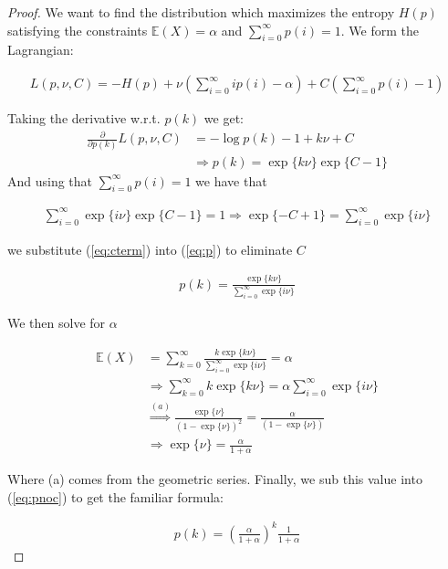 \documentclass[]{article}
\theoremstyle{mattstyle}
\theoremstyle{definition}
\begin{document}
\begin{proof}
	We want to find the distribution which maximizes the entropy $H(p)$ satisfying the constraints $\mathbb{E}(X)=\alpha$ and $\sum_{i=0}^{\infty}p(i)=1$. We form the Lagrangian:
	
	\begin{align*}
	L(p,\nu, C)=-H(p)+\nu \left(\sum_{i=0}^{\infty} ip(i)-\alpha\right) + C\left( \sum_{i=0}^{\infty}p(i)-1 \right)
	\end{align*}
	
	Taking the derivative w.r.t. $p(k)$ we get:
	\begin{align}\label{eq:p}
	\frac{\partial}{\partial p(k)}L(p,\nu, C)&= -\log p(k) - 1 + k\nu + C\\
	&\Rightarrow p(k) = \exp\{k\nu\}\exp\{C-1\}
	\end{align}
	And using that $\sum_{i=0}^{\infty}p(i)=1$ we have that
	
	\begin{align}\label{eq:cterm}
	\sum_{i=0}^{\infty}\exp\{i\nu\}\exp\{C-1\}
	= 1 \Rightarrow \exp\{-C+1\} = \sum_{i=0}^{\infty}\exp\{i\nu\}
	\end{align}
	
	we substitute (\ref{eq:cterm}) into (\ref{eq:p}) to eliminate $C$
	
	\begin{align}\label{eq:pnoc}
	p(k)=\frac{\exp\{k\nu\}}{\sum_{i=0}^{\infty}\exp\{i\nu\}}
	\end{align}
	
	We then solve for $\alpha$
	
	\begin{align*}
	\mathbb{E}(X)&=\sum_{k=0}^{\infty}\frac{k\exp\{k\nu\}}{\sum_{i=0}^{\infty}\exp\{i\nu\}}=\alpha\\
	&\Rightarrow \sum_{k=0}^{\infty}k\exp\{k\nu\}=\alpha\sum_{i=0}^{\infty}\exp\{i\nu\}\\
	&\overset{(a)}{\Rightarrow} \frac{\exp\{\nu\}}{(1-\exp\{\nu\})^2} = \frac{\alpha}{(1-\exp\{\nu\})}\\
	&\Rightarrow \exp\{\nu\} = \frac{\alpha}{1+\alpha}
	\end{align*}
	
	Where (a) comes from the geometric series. Finally, we sub this value into (\ref{eq:pnoc}) to get the familiar formula:
	
	\begin{align}
	p(k)=\left(\frac{\alpha}{1+\alpha}\right)^k\frac{1}{1+\alpha}
	\end{align}
\end{proof}
\end{document}
